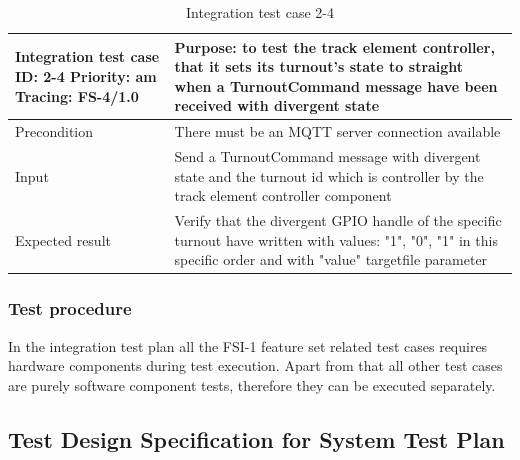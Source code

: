 \begin{table}[H]
	\caption{Integration test case 2-4}
	\label{table:TCase-FSI2-4}
	\begin{center}
		\renewcommand{\arraystretch}{1.8}
		\begin{tabu} 
			to 0.9 \textwidth
			{  X[0.4, c] X[c] }
			\toprule
			Integration test case ID: 2-4 \newline Priority: am \newline Tracing: FS-4/1.0 & Purpose: to test the track element controller, that it sets its turnout's state to straight when a TurnoutCommand message have been received with divergent state  \\ \midrule
			Precondition                                                                   & There must be an MQTT server connection available                                                                                                                 \\
			Input                                                                          & Send a TurnoutCommand message with divergent state and the turnout id which is controller by the track element controller component                                \\
			Expected result                                                                & Verify that the divergent GPIO handle of the specific turnout have written with values: "1", "0", "1" in this specific order and with "value" targetfile parameter \\ \bottomrule
		\end{tabu}
	\end{center}
\end{table} 

\subsubsection{Test procedure} 
In the integration test plan all the FSI-1 feature set related test cases requires hardware components during test execution. Apart from that all other test cases are purely software component tests, therefore they can be executed separately.


\subsection{Test Design Specification for System Test Plan}

